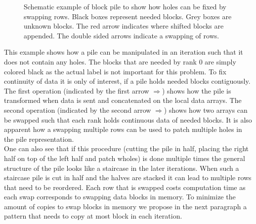 \begin{figure}
	\caption{Schematic example of block pile to show how holes can be fixed by swapping rows. Black boxes represent needed blocks. Grey boxes are unknown blocks. The red arrow indicates where shifted blocks are appended. The double sided arrows indicate a swapping of rows.}
	\label{fig:swapHole}
\end{figure}
This example shows how a pile can be manipulated in an iteration such that it does not contain any holes. The blocks that are needed by rank 0 are simply colored black as the actual label is not important for this problem. To fix continuity of data it is only of interest, if a pile holds needed blocks contiguously.\\
The first operation (indicated by the first arrow $\Rightarrow$) shows how the pile is transformed when data is sent and concatenated on the local data arrays. The second operation (indicated by the second arrow $\Rightarrow$) shows how two arrays can be swapped such that each rank holds continuous data of needed blocks. It is also apparent how a swapping multiple rows can be used to patch multiple holes in the pile representation.\\
One can also see that if this procedure (cutting the pile in half, placing the right half on top of the left half and patch wholes) is done multiple times the general structure of the pile looks like a staircase in the later iterations. When such a staircase pile is cut in half and the halves are stacked it can lead to multiple rows that need to be reordered. Each row that is swapped costs computation time as each swap corresponds to swapping data blocks in memory. To minimize the amount of copies to swap blocks in memory we propose in the next paragraph a pattern that needs to copy at most block in each iteration.

